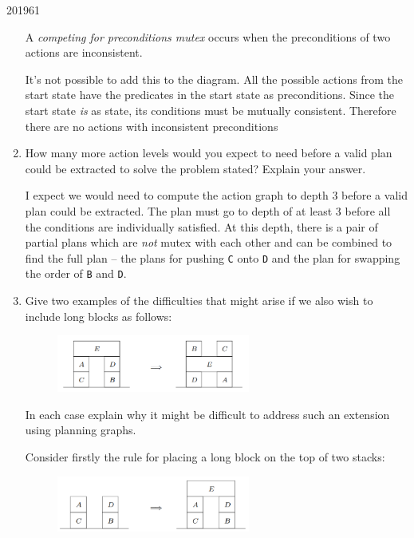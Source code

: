 \documentclass[10pt,\jkfside,a4paper]{article}
\begin{document}
\begin{examquestion}{2019}{6}{1}
\begin{enumerate}[label=(\alph*)]
A \textit{competing for preconditions mutex} occurs when the preconditions
of two actions are inconsistent.

It's not possible to add this to the diagram. All the possible actions from
the start state have the predicates in the start state as preconditions.
Since the start state \textit{is} as state, its conditions must be mutually
consistent. Therefore there are no actions with inconsistent preconditions

\item How many more action levels would you expect to need before a valid
plan could be extracted to solve the problem stated? Explain your answer.

I expect we would need to compute the action graph to depth 3 before a valid
plan could be extracted. The plan must go to depth of at least 3 before all
the conditions are individually satisfied. At this depth, there is a
pair of partial plans which are \textit{not} mutex with each other and can
be combined to find the full plan -- the plans for pushing \texttt{C} onto
\texttt{D} and the plan for swapping the order of \texttt{B} and \texttt{D}.

\item Give two examples of the difficulties that might arise if we also
wish to include long blocks as follows:
\begin{figure}[H]
\centering
\includegraphics[width=0.6\textwidth]{2019longblocks}
\end{figure}

In each case explain why it might be difficult to address such an extension
using planning graphs.

Consider firstly the rule for placing a long block on the top of two stacks:

\begin{figure}[H]
\centering
\includegraphics[width=0.6\textwidth]{2019longblockrule1}
\end{figure}


\end{enumerate}
\end{examquestion}
\end{document}
